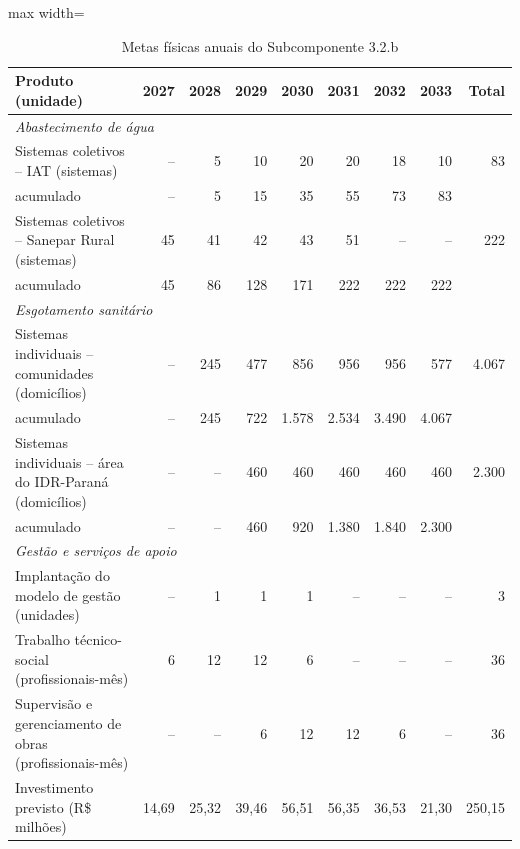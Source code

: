 \begin{table}[htbp]
\centering
\caption{Metas físicas anuais do Subcomponente 3.2.b}
\label{tab:metas-anuais}
\footnotesize
\renewcommand{\arraystretch}{1.2}
\begin{adjustbox}{max width=\linewidth}
\begin{tabular}{lrrrrrrrr}
\toprule
\textbf{Produto (unidade)} & \textbf{2027} & \textbf{2028} & \textbf{2029} &
\textbf{2030} & \textbf{2031} & \textbf{2032} & \textbf{2033} & \textbf{Total} \\
\midrule
\multicolumn{9}{l}{\textit{Abastecimento de água}} \\
Sistemas coletivos -- IAT (sistemas) & -- & 5 & 10 & 20 & 20 & 18 & 10 & 83 \\
\quad acumulado & -- & 5 & 15 & 35 & 55 & 73 & 83 & \\
Sistemas coletivos -- Sanepar Rural (sistemas) & 45 & 41 & 42 & 43 & 51 & -- & -- & 222 \\
\quad acumulado & 45 & 86 & 128 & 171 & 222 & 222 & 222 & \\
\multicolumn{9}{l}{\textit{Esgotamento sanitário}} \\
Sistemas individuais -- comunidades (domicílios) & -- & 245 & 477 & 856 & 956 & 956 & 577 & 4.067 \\
\quad acumulado & -- & 245 & 722 & 1.578 & 2.534 & 3.490 & 4.067 & \\
Sistemas individuais -- área do IDR-Paraná (domicílios) & -- & -- & 460 & 460 & 460 & 460 & 460 & 2.300 \\
\quad acumulado & -- & -- & 460 & 920 & 1.380 & 1.840 & 2.300 & \\
\multicolumn{9}{l}{\textit{Gestão e serviços de apoio}} \\
Implantação do modelo de gestão (unidades) & -- & 1 & 1 & 1 & -- & -- & -- & 3 \\
Trabalho técnico-social (profissionais-mês) & 6 & 12 & 12 & 6 & -- & -- & -- & 36 \\
Supervisão e gerenciamento de obras (profissionais-mês) & -- & -- & 6 & 12 & 12 & 6 & -- & 36 \\
\midrule
Investimento previsto (R\$ milhões) & 14,69 & 25,32 & 39,46 & 56,51 & 56,35 & 36,53 & 21,30 & 250,15 \\
\bottomrule
\end{tabular}
\end{adjustbox}
\end{table}

